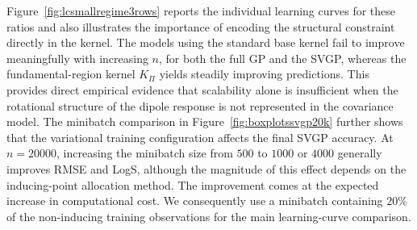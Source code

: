\documentclass[11pt,a4paper]{article}
\begin{document}
Figure~\ref{fig:lcsmallregime3rows} reports the individual learning curves for these ratios and also illustrates the importance of encoding the structural constraint directly in the kernel. The models using the standard base kernel fail to improve meaningfully with increasing $n$, for both the full GP and the SVGP, whereas the fundamental-region kernel $K_\Pi$ yields steadily improving predictions. This provides direct empirical evidence that scalability alone is insufficient when the rotational structure of the dipole response is not represented in the covariance model. The minibatch comparison in Figure~\ref{fig:boxplotssvgp20k} further shows that the variational training configuration affects the final SVGP accuracy. At $n=20000$, increasing the minibatch size from $500$ to $1000$ or $4000$ generally improves RMSE and LogS, although the magnitude of this effect depends on the inducing-point allocation method. The improvement comes at the expected increase in computational cost. We consequently use a minibatch containing $20\%$ of the non-inducing training observations for the main learning-curve comparison.
\end{document}
